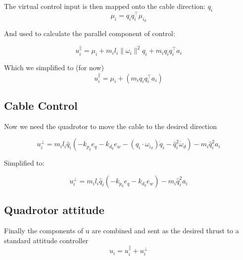 \documentclass[12pt]{article}
\begin{document}
The virtual control input is then mapped onto the cable direction: $q_i$
$$ \mu_i = q_i q_i^\top \mu_{i_d} $$

And used to calculate the parallel component of control:

$$u_i^\| = \mu_i + m_i l_i \|\omega_i\|^2 q_i + m_i q_i q_i^\top a_i$$

Which we simplified to (for now)
$$u_i^\| = \mu_i + (m_i q_i q_i^\top a_i)$$

\subsection{Cable Control}
Now we need the quadrotor to move the cable to the desired direction

$$ u_i^\perp = m_i l_i \hat{q}_i (-k_{p_q} e_q - k_{d_q} e_w - (q_i \cdot \omega_{i_d}) \dot{q}_i - \hat{q}_i^2 \dot{\omega}_d) - m_i \hat{q}_i^2 a_i $$

Simplified to:

$$ u_i^\perp = m_i l_i \hat{q}_i (-k_{p_q} e_q - k_{d_q} e_w) - m_i \hat{q}_i^2 a_i $$

\subsection{Quadrotor attitude}
Finally the components of u are combined and sent as the desired thrust to a standard attitude controller
$$u_i = u_i^\| + u_i^\perp $$



\end{document}
